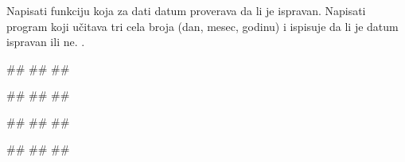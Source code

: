 \begin{Exercise}[label=ispravan_datum] 
Napisati funkciju 
koja za dati datum proverava da li je ispravan. Napisati program koji
učitava tri cela broja (dan, mesec, godinu) i ispisuje da li je datum
ispravan ili ne. .

\begin{miditest}
\begin{upotreba}{1}
#\naslovInt#
##
##
\end{upotreba}
\end{miditest}
\begin{miditest}
\begin{upotreba}{2}
#\naslovInt#
##
##
\end{upotreba}
\end{miditest}

\begin{miditest}
\begin{upotreba}{3}
#\naslovInt#
##
##
\end{upotreba}
\end{miditest}
\begin{miditest}
\begin{upotreba}{4}
#\naslovInt#
##
##
\end{upotreba}
\end{miditest}

\end{Exercise}


